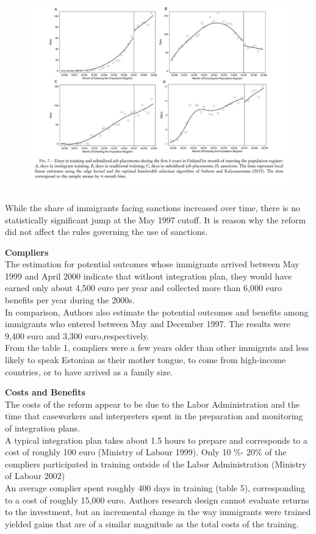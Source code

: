 \documentclass[../root]{subfiles}
\begin{document}
    \begin{figure}[h]
        \includegraphics[width=15cm]{0703sugiyama/Figure7.png}
    \end{figure}
    While the share of immigrants facing sanctions increased over time, there is no statistically significant jump at the May 1997 cutoff. It is reason why the reform did not affect the rules governing the use of sanctions.
    
    {\bf Compliers} \\
    The estimation for potential outcomes whose immigrants arrived between May 1999 and April 2000 indicate that without integration plan, they would have earned only about 4,500 euro per year and collected more than 6,000 euro benefits per year during the 2000s. \\
    In comparison, Authors also estimate the potential outcomes and benefits among immigrants who entered between May and December 1997.  The results were 9,400 euro and 3,300 euro,respectively. \\
    From the table 1, compliers were a few years older than other immigrnts and less likely to speak Estonian as their mother tongue, to come from high-income countries, or to have arrived as a family size. 
    
    {\bf Costs and Benefits} \\
    The costs of the reform appear to be due to the Labor Administration and the time that caseworkers and interpreters spent in the preparation and monitoring of integration plans. \\
    A typical integration plan takes about 1.5 hours to prepare and corresponds to a cost of roughly 100 euro (Ministry of Labour 1999).
    Only 10 \%- 20\% of the compliers participated in training outside of the Labor Administration (Ministry of Labour 2002) \\
    An average complier spent roughly 400 days in training (table 5), corresponding to a cost of roughly 15,000 euro.
    Authors research design cannot evaluate returns to the investment, but an incremental change in the way immigrants were trained yielded gains that are of a similar magnitude as the total costs of the training.
    
\end{document}
